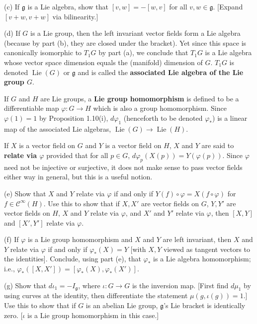 \documentclass[leqno]{book}
\begin{document}
\begin{enumerate}
(c) If $\mathfrak g$ is a Lie algebra, show that $[v,w]=-[w,v]$ for all $v,w\in\mathfrak g$.  [Expand $[v+w,v+w]$ via bilinearity.]

(d) If $G$ is a Lie group, then the left invariant vector fields form a Lie algebra (because by part (b), they are closed under the bracket).  Yet since this space is canonically isomorphic to $T_1G$ by part (a), we conclude that $T_1G$ is a Lie algebra whose vector space dimension equals the (manifold) dimension of $G$.  $T_1G$ is denoted $\operatorname{Lie}(G)$ or $\mathfrak g$ and is called the \textbf{associated Lie algebra of the Lie group $G$}.

If $G$ and $H$ are Lie groups, a \textbf{Lie group homomorphism} is defined to be a differentiable map $\varphi:G\to H$ which is also a group homomorphism.  Since $\varphi(1)=1$ by Proposition 1.10(i), $d\varphi_1$ (henceforth to be denoted $\varphi_*$) is a linear map of the associated Lie algebras, $\operatorname{Lie}(G)\to\operatorname{Lie}(H)$.

If $X$ is a vector field on $G$ and $Y$ is a vector field on $H$, $X$ and $Y$ are said to \textbf{relate via $\varphi$} provided that for all $p\in G$, $d\varphi_p(X(p))=Y(\varphi(p))$.  Since $\varphi$ need not be injective or surjective, it does not make sense to pass vector fields either way in general, but this is a useful notion.

(e) Show that $X$ and $Y$ relate via $\varphi$ if and only if $Y(f)\circ\varphi=X(f\circ\varphi)$ for $f\in\mathcal C^\infty(H)$.  Use this to show that if $X,X'$ are vector fields on $G$, $Y,Y'$ are vector fields on $H$, $X$ and $Y$ relate via $\varphi$, and $X'$ and $Y'$ relate via $\varphi$, then $[X,Y]$ and $[X',Y']$ relate via $\varphi$.

(f) If $\varphi$ is a Lie group homomorphism and $X$ and $Y$ are left invariant, then $X$ and $Y$ relate via $\varphi$ if and only if $\varphi_*(X)=Y$ [with $X,Y$ viewed as tangent vectors to the identities].  Conclude, using part (e), that $\varphi_*$ is a Lie algebra homomorphism; i.e., $\varphi_*([X,X'])=[\varphi_*(X),\varphi_*(X')]$.

(g) Show that $d\iota_1=-I_{\mathfrak g}$, where $\iota:G\to G$ is the inversion map.  [First find $d\mu_1$ by using curves at the identity, then differentiate the statement $\mu(g,\iota(g))=1$.]  Use this to show that if $G$ is an abelian Lie group, $\mathfrak g$'s Lie bracket is identically zero.  [$\iota$ is a Lie group homomorphism in this case.]


\end{enumerate}
\end{document}
